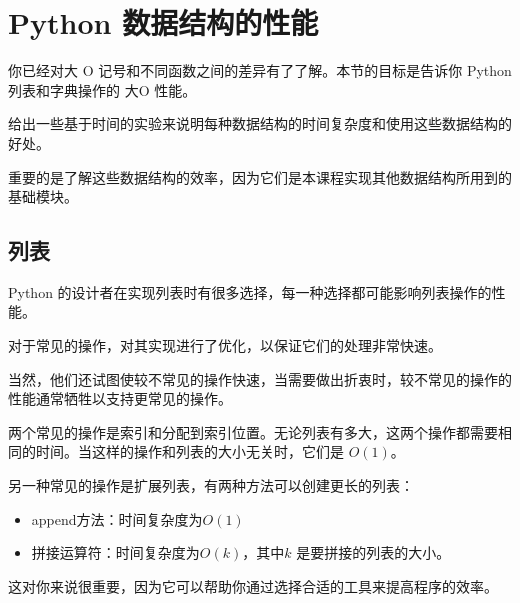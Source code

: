 \section{Python 数据结构的性能}

\begin{frame}\ft{\secname}
  你已经对大 O 记号和不同函数之间的差异有了了解。本节的目标是告诉你 Python 列表和字典操作的 大O 性能。


  给出一些基于时间的实验来说明每种数据结构的时间复杂度和使用这些数据结构的好处。

  重要的是了解这些数据结构的效率，因为它们是本课程实现其他数据结构所用到的基础模块。


\end{frame}



\subsection{列表}
\begin{frame}\ft{\subsecname}
  Python 的设计者在实现列表时有很多选择，每一种选择都可能影响列表操作的性能。

  对于常见的操作，对其实现进行了优化，以保证它们的处理非常快速。

  当然，他们还试图使较不常见的操作快速，当需要做出折衷时，较不常见的操作的性能通常牺牲以支持更常见的操作。
\end{frame}

\begin{frame}\ft{\subsecname}
  两个常见的操作是索引和分配到索引位置。无论列表有多大，这两个操作都需要相同的时间。当这样的操作和列表的大小无关时，它们是 $O(1)$。

\end{frame}

\begin{frame}\ft{\subsecname}
  
  另一种常见的操作是扩展列表，有两种方法可以创建更长的列表：
  \begin{itemize}
  \item append方法：时间复杂度为$O(1)$
  \item 拼接运算符：时间复杂度为$O(k)$，其中$k$ 是要拼接的列表的大小。
  \end{itemize}
  这对你来说很重要，因为它可以帮助你通过选择合适的工具来提高程序的效率。
\end{frame}

